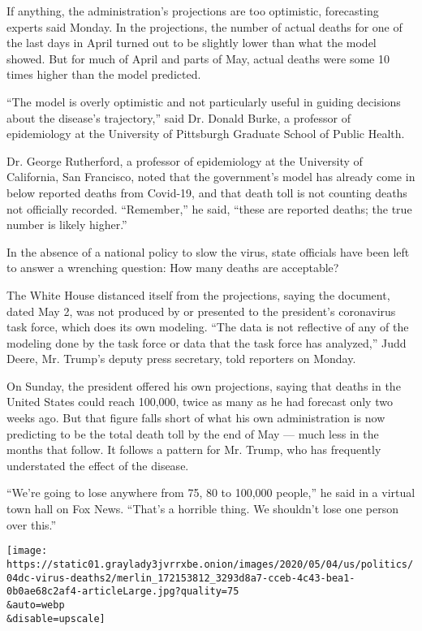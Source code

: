 If anything, the administration's projections are too optimistic,
forecasting experts said Monday. In the projections, the number of
actual deaths for one of the last days in April turned out to be
slightly lower than what the model showed. But for much of April and
parts of May, actual deaths were some 10 times higher than the model
predicted.

``The model is overly optimistic and not particularly useful in guiding
decisions about the disease's trajectory,'' said Dr. Donald Burke, a
professor of epidemiology at the University of Pittsburgh Graduate
School of Public Health.

Dr. George Rutherford, a professor of epidemiology at the University of
California, San Francisco, noted that the government's model has already
come in below reported deaths from Covid-19, and that death toll is not
counting deaths not officially recorded. ``Remember,'' he said, ``these
are reported deaths; the true number is likely higher.''

In the absence of a national policy to slow the virus, state officials
have been left to answer a wrenching question: How many deaths are
acceptable?

The White House distanced itself from the projections, saying the
document, dated May 2, was not produced by or presented to the
president's coronavirus task force, which does its own modeling. ``The
data is not reflective of any of the modeling done by the task force or
data that the task force has analyzed,'' Judd Deere, Mr. Trump's deputy
press secretary, told reporters on Monday.

On Sunday, the president offered his own projections, saying that deaths
in the United States could reach 100,000, twice as many as he had
forecast only two weeks ago. But that figure falls short of what his own
administration is now predicting to be the total death toll by the end
of May --- much less in the months that follow. It follows a pattern for
Mr. Trump, who has frequently understated the effect of the disease.

``We're going to lose anywhere from 75, 80 to 100,000 people,'' he said
in a virtual town hall on Fox News. ``That's a horrible thing. We
shouldn't lose one person over this.''

\texttt{[image: https://static01.graylady3jvrrxbe.onion/images/2020/05/04/us/politics/04dc-virus-deaths2/merlin\_172153812\_3293d8a7-cceb-4c43-bea1-0b0ae68c2af4-articleLarge.jpg?quality=75\\\&auto=webp\\\&disable=upscale]}

